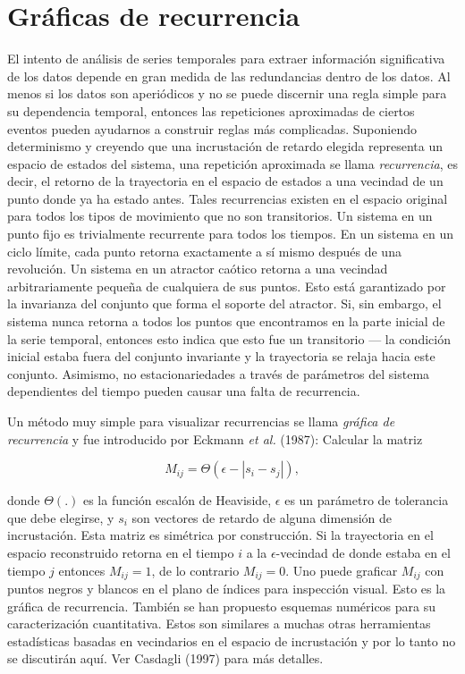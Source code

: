 \documentclass[10pt,a4paper]{book}
\begin{document}
\newpage

\section{Gráficas de recurrencia}

El intento de análisis de series temporales para extraer información significativa de los datos depende en gran medida de las redundancias dentro de los datos. Al menos si los datos son aperiódicos y no se puede discernir una regla simple para su dependencia temporal, entonces las repeticiones aproximadas de ciertos eventos pueden ayudarnos a construir reglas más complicadas. Suponiendo determinismo y creyendo que una incrustación de retardo elegida representa un espacio de estados del sistema, una repetición aproximada se llama \textit{recurrencia}, es decir, el retorno de la trayectoria en el espacio de estados a una vecindad de un punto donde ya ha estado antes. Tales recurrencias existen en el espacio original para todos los tipos de movimiento que no son transitorios. Un sistema en un punto fijo es trivialmente recurrente para todos los tiempos. En un sistema en un ciclo límite, cada punto retorna exactamente a sí mismo después de una revolución. Un sistema en un atractor caótico retorna a una vecindad arbitrariamente pequeña de cualquiera de sus puntos. Esto está garantizado por la invarianza del conjunto que forma el soporte del atractor. Si, sin embargo, el sistema nunca retorna a todos los puntos que encontramos en la parte inicial de la serie temporal, entonces esto indica que esto fue un transitorio — la condición inicial estaba fuera del conjunto invariante y la trayectoria se relaja hacia este conjunto. Asimismo, no estacionariedades a través de parámetros del sistema dependientes del tiempo pueden causar una falta de recurrencia.

Un método muy simple para visualizar recurrencias se llama \textit{gráfica de recurrencia} y fue introducido por Eckmann \textit{et al.} (1987): Calcular la matriz

\[
M_{ij} = \Theta(\epsilon - |s_i - s_j|) ,
\]

donde $\Theta(.)$ es la función escalón de Heaviside, $\epsilon$ es un parámetro de tolerancia que debe elegirse, y $s_i$ son vectores de retardo de alguna dimensión de incrustación. Esta matriz es simétrica por construcción. Si la trayectoria en el espacio reconstruido retorna en el tiempo $i$ a la $\epsilon$-vecindad de donde estaba en el tiempo $j$ entonces $M_{ij} = 1$, de lo contrario $M_{ij} = 0$. Uno puede graficar $M_{ij}$ con puntos negros y blancos en el plano de índices para inspección visual. Esto es la gráfica de recurrencia. También se han propuesto esquemas numéricos para su caracterización cuantitativa. Estos son similares a muchas otras herramientas estadísticas basadas en vecindarios en el espacio de incrustación y por lo tanto no se discutirán aquí. Ver Casdagli (1997) para más detalles.
\end{document}
